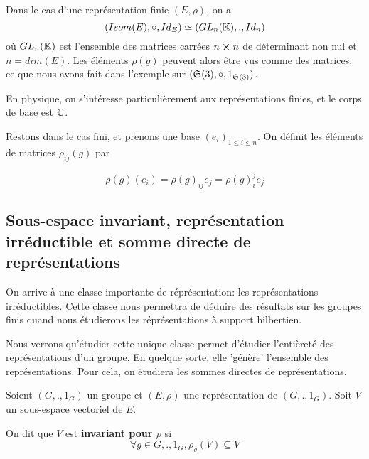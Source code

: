 Dans le cas d'une représentation finie $(E, \rho)$, on a
\begin{equation}
	(Isom(E), \circ, Id_{E})
	\simeq (GL_{n}(\mathbb{K}), ., Id_{n})
\end{equation}
où
$GL_{n}(\mathbb{K})$ est l'ensemble des matrices carrées $n
\cross n$ de déterminant non nul et $n = dim(E)$. Les éléments $\rho(g)$ peuvent alors être
vus comme des matrices, ce que nous avons fait dans l'exemple sur
$(\mathfrak{S}(3), \circ, 1_{\mathfrak{S}(3)})$.

En physique, on s'intéresse particulièrement aux représentations finies, et le
corps de base est $\mathbb{C}$.

Restons dans le cas fini, et prenons une base $(e_{i})_{1 \leq i \leq n}$. On
définit les éléments de matrices $\rho_{ij}(g)$ par

\begin{equation}
	\rho(g)(e_{i}) = \rho(g)_{ij} e_{j} = \rho(g)_{i}^{j} e_{j}
\end{equation}

\subsection{Sous-espace invariant, représentation irréductible et somme directe
de représentations}

On arrive à une classe importante de réprésentation: les représentations
irréductibles. Cette classe nous permettra de déduire des résultats sur les
groupes finis quand nous étudierons les réprésentations à support hilbertien.

Nous verrons qu'étudier cette unique classe permet d'étudier l'entièreté des
représentations d'un groupe. En quelque sorte, elle 'génère' l'ensemble des
représentations.
Pour cela, on étudiera les sommes directes de représentations.

\begin{definition} 
	Soient $(G, ., 1_{G})$ un groupe et $(E, \rho)$ une représentation de $(G, ., 1_{G})$.
	Soit $V$ un sous-espace vectoriel de $E$.

	On dit que $V$ est \textbf{invariant pour $\rho$} si
	\begin{equation}
		\forall g \in G, ., 1_{G}, \rho_{g}(V) \subseteq V
		\label{definition_invariant_subspace}
	\end{equation}
\end{definition}


